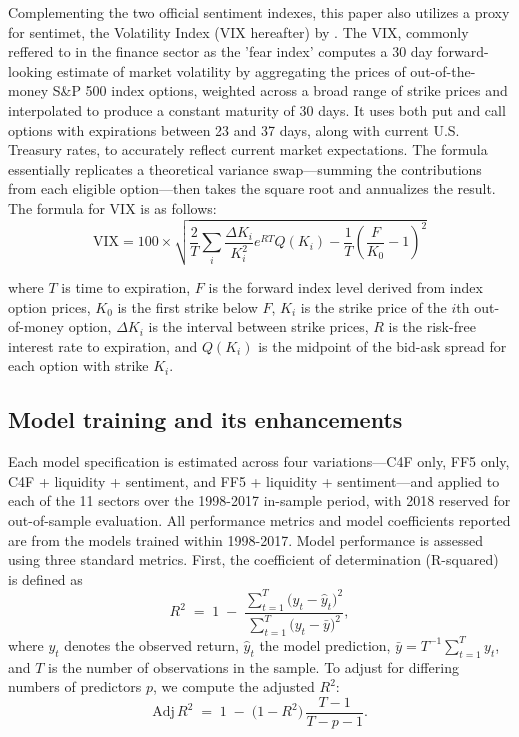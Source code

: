 Complementing the two official sentiment indexes, this paper also utilizes a proxy for sentimet, the Volatility Index (VIX hereafter) by . The VIX, commonly reffered to in the finance sector as the 'fear index' computes a 30 day forward-looking estimate of market volatility by aggregating the prices of out-of-the-money S\&P 500 index options, weighted across a broad range of strike prices and interpolated to produce a constant maturity of 30 days. It uses both put and call options with expirations between 23 and 37 days, along with current U.S. Treasury rates, to accurately reflect current market expectations. The formula essentially replicates a theoretical variance swap—summing the contributions from each eligible option—then takes the square root and annualizes the result. The formula for VIX is as follows:
\begin{equation}
    \label{eq:vix}
    \text{VIX} = 100 \times \sqrt{\frac{2}{T} \sum_i \frac{\Delta K_i}{K_i^2} e^{RT} Q(K_i) - \frac{1}{T} \left(\frac{F}{K_0} - 1\right)^2}
\end{equation}

where $T$ is time to expiration, $F$ is the forward index level derived from index option prices, $K_0$ is the first strike below $F$, $K_i$ is the strike price of the $i$th out-of-money option, $\Delta K_i$ is the interval between strike prices, $R$ is the risk-free interest rate to expiration, and $Q(K_i)$ is the midpoint of the bid-ask spread for each option with strike $K_i$.

 
\subsection{Model training and its enhancements}

Each model specification is estimated across four variations—C4F only, FF5 only, C4F + liquidity + sentiment, and FF5 + liquidity + sentiment—and applied to each of the 11 sectors over the 1998-2017 in-sample period, with 2018 reserved for out-of-sample evaluation. All performance metrics and model coefficients reported are from the models trained within 1998-2017. Model performance is assessed using three standard metrics.  First, the coefficient of determination (R-squared) is defined as  
\begin{equation}
\label{eq:rsquared}
R^2 \;=\; 1 \;-\; \frac{\sum_{t=1}^{T}\bigl(y_{t}-\hat y_{t}\bigr)^2}{\sum_{t=1}^{T}\bigl(y_{t}-\bar y\bigr)^2},
\end{equation}  
where \(y_t\) denotes the observed return, \(\hat y_t\) the model prediction, \(\bar y = T^{-1}\sum_{t=1}^T y_t\), and \(T\) is the number of observations in the sample.  To adjust for differing numbers of predictors \(p\), we compute the adjusted \(R^2\):  
\begin{equation}
\label{eq:adjrsquared}
\mathrm{Adj}\,R^2 \;=\; 1 \;-\; \bigl(1 - R^2\bigr)\,\frac{T - 1}{T - p - 1}.
\end{equation}  

